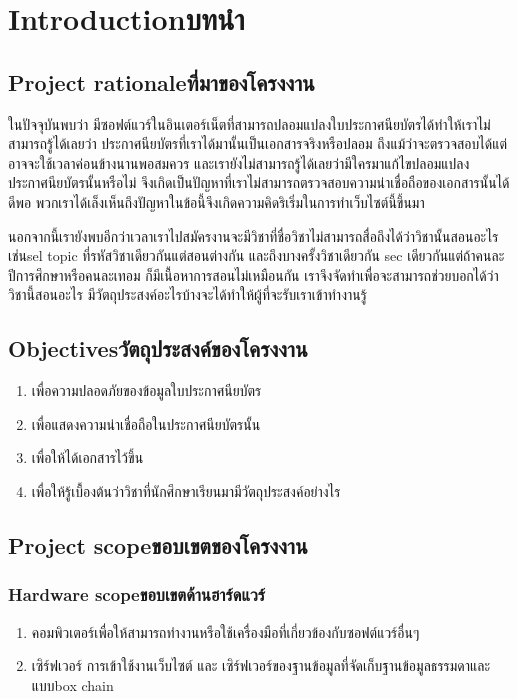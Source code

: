 \chapter{\ifenglish Introduction\else บทนำ\fi}

\section{\ifenglish Project rationale\else ที่มาของโครงงาน\fi}
\enskip \enskip \enskip \enskip \enskip 
ในปัจจุบันพบว่า มีซอฟต์แวร์ในอินเตอร์เน็ตที่สามารถปลอมแปลงใบประกาศนียบัตรได้ทำให้เราไม่สามารถรู้ได้เลยว่า ประกาศนียบัตรที่เราได้มานั้นเป็นเอกสารจริงหรือปลอม 
ถึงแม้ว่าจะตรวจสอบได้แต่อาจจะใช้เวลาค่อนข้างนานพอสมควร  และเรายังไม่สามารถรู้ได้เลยว่ามีใครมาแก้ไขปลอมแปลงประกาศนียบัตรนั้นหรือไม่
จึงเกิดเป็นปัญหาที่เราไม่สามารถตรวจสอบความน่าเชื่อถือของเอกสารนั้นได้ดีพอ พวกเราได้เล็งเห็นถึงปัญหาในข้อนี้จึงเกิดความคิดริเริ่มในการทำเว็บไซต์นี้ขึ้นมา 

\enskip \enskip
นอกจากนี้เรายังพบอีกว่าเวลาเราไปสมัครงานจะมีวิชาที่ชื่อวิชาไม่สามารถสื่อถึงได้ว่าวิชานั้นสอนอะไรเช่นsel topic ที่รหัสวิชาเดียวกันแต่สอนต่างกัน และถึงบางครั้งวิชาเดียวกัน sec เดียวกันแต่ถ้าคนละปีการศึกษาหรือคนละเทอม ก็มีเนื้อหาการสอนไม่เหมือนกัน เราจึงจัดทำเพื่อจะสามารถช่วยบอกได้ว่าวิชานี้สอนอะไร มีวัตถุประสงค์อะไรบ้างจะได้ทำให้ผู้ที่จะรับเราเข้าทำงานรู้


\section{\ifenglish Objectives\else วัตถุประสงค์ของโครงงาน\fi}
\begin{enumerate}
    \item เพื่อความปลอดภัยของข้อมูลใบประกาศนียบัตร
    \item เพื่อแสดงความน่าเชื่อถือในประกาศนียบัตรนั้น
    \item เพื่อให้ได้เอกสารไว้ขึ้น
    \item เพื่อให้รู้เบื้องต้นว่าวิชาที่นักศึกษาเรียนมามีวัตถุประสงค์อย่างไร
\end{enumerate}

\section{\ifenglish Project scope\else ขอบเขตของโครงงาน\fi}

\subsection{\ifenglish Hardware scope\else ขอบเขตด้านฮาร์ดแวร์\fi}
\begin{enumerate}
    \item คอมพิวเตอร์เพื่อให้สามารถทํางานหรือใช้เครื่องมือที่เกี่ยวข้องกับซอฟต์แวร์อื่นๆ
    \item เซิร์ฟเวอร์ การเข้าใช้งานเว็บไซต์ และ เซิร์ฟเวอร์ของฐานข้อมูลที่จัดเก็บฐานข้อมูลธรรมดาและแบบbox chain
\end{enumerate}
